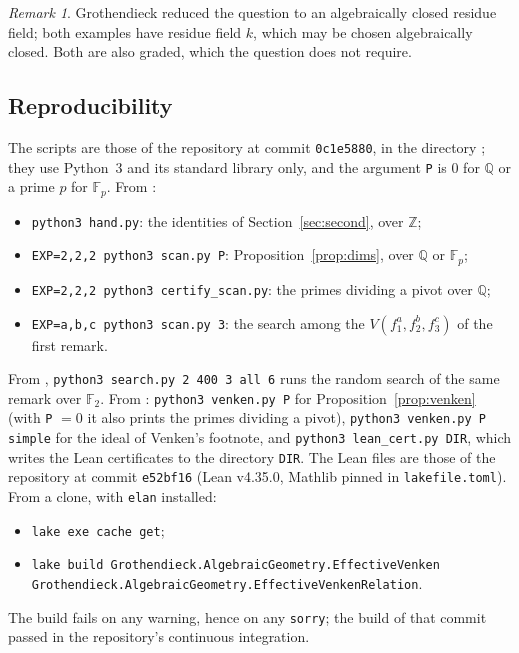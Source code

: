 \documentclass[11pt,a4paper]{amsart}
\theoremstyle{remark}
\newtheorem{remark}[theorem]{Remark}
\newcommand{\F}{\mathbb F}
\newcommand{\Q}{\mathbb Q}
\newcommand{\Z}{\mathbb Z}
\begin{document}
\begin{remark}
Grothendieck reduced the question to an algebraically closed residue field; both examples have residue field $k$, which may be chosen algebraically closed. Both are also graded, which the question does not require.
\end{remark}

\subsection*{Reproducibility}
The scripts are those of the repository \cite{repo} at commit \texttt{0c1e5880}, in the directory ; they use Python~3 and its standard library only, and the argument \texttt{P} is $0$ for $\Q$ or a prime $p$ for $\F_p$. From :
\begin{itemize}\raggedright
\item \texttt{python3 hand.py}: the identities of Section~\ref{sec:second}, over $\Z$;
\item \texttt{EXP=2,2,2 python3 scan.py P}: Proposition~\ref{prop:dims}, over $\Q$ or $\F_p$;
\item \texttt{EXP=2,2,2 python3 certify\_scan.py}: the primes dividing a pivot over $\Q$;
\item \texttt{EXP=a,b,c python3 scan.py 3}: the search among the $V(f_1^a, f_2^b, f_3^c)$ of the first remark.
\end{itemize}
{\raggedright From , \texttt{python3 search.py 2 400 3 all 6} runs the random search of the same remark over $\F_2$. From : \texttt{python3 venken.py P} for Proposition~\ref{prop:venken} (with \texttt{P} $= 0$ it also prints the primes dividing a pivot), \texttt{python3 venken.py P simple} for the ideal of Venken's footnote, and \texttt{python3 lean\_cert.py DIR}, which writes the Lean certificates to the directory \texttt{DIR}. The Lean files are those of the repository \cite{leanrepo} at commit \texttt{e52bf16} (Lean v4.35.0, Mathlib pinned in \texttt{lakefile.toml}). From a clone, with \texttt{elan} installed:\par}
\begin{itemize}
\item \texttt{lake exe cache get};
\item \texttt{lake build Grothendieck.AlgebraicGeometry.EffectiveVenken}\\ \texttt{\phantom{lake build }Grothendieck.AlgebraicGeometry.EffectiveVenkenRelation}.
\end{itemize}
The build fails on any warning, hence on any \texttt{sorry}; the build of that commit passed in the repository's continuous integration.
\end{document}
